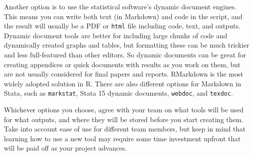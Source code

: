 Another option is to use the statistical software's dynamic document engines.
This means you can write both text (in Markdown) and code in the script,
and the result will usually be a PDF or \texttt{html} file including code, text, and outputs.
Dynamic document tools are better for including large chunks of code and dynamically created graphs and tables,
but formatting these can be much trickier and less full-featured than other editors.
So dynamic documents can be great for creating appendices
or quick documents with results as you work on them,
but are not usually considered for final papers and reports.
RMarkdown is the most widely adopted solution in R.
There are also different options for Markdown in Stata,
such as \texttt{markstat},
Stata 15 dynamic documents,
\texttt{webdoc}, and
\texttt{texdoc}.

Whichever options you choose,
agree with your team on what tools will be used for what outputs, and
where they will be stored before you start creating them.
Take into account ease of use for different team members, but
keep in mind that learning how to use a new tool may require some
time investment upfront that will be paid off as your project advances.




